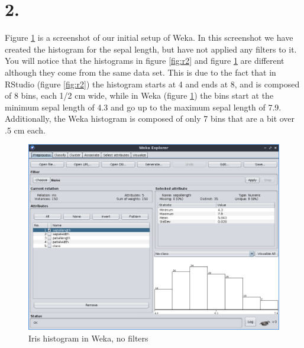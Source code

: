 \documentclass[10pt]{article}
\begin{document}
\section*{2.}
Figure \ref{fig:weka1} is a screenshot of our initial setup of Weka.  In this 
screenshot we have created the histogram for the sepal length, but have not 
applied any filters to it.  You will notice that the histograms in figure 
\ref{fig:r2} and figure \ref{fig:weka1} are different although they come from 
the same data set.  This is due to the fact that in RStudio (figure 
\ref{fig:r2}) the histogram starts at 4 and ends at 8, and is composed of 8 
bins, each 1/2 cm wide, while in Weka (figure \ref{fig:weka1}) the bins start at 
the minimum sepal length of 4.3 and go up to the maximum sepal length of 7.9.  
Additionally, the Weka histogram is composed of only 7 bins that are a bit over
.5 cm each.  
\begin{figure}[]
    \includegraphics[width=\textwidth]{selectWeka}
    \caption{Iris histogram in Weka, no filters}
    \label{fig:weka1}
\end{figure}
\end{document}
